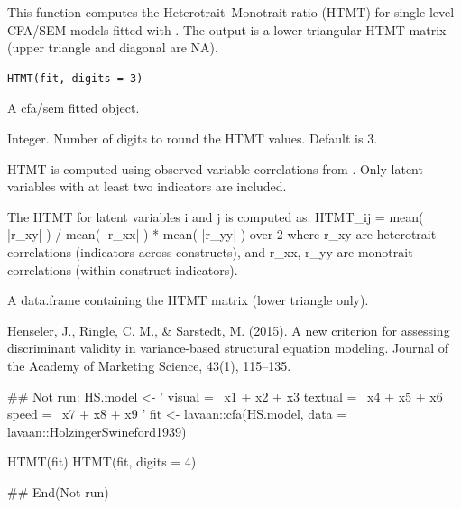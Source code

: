 \documentclass[a4paper]{book}
\begin{document}
%
\begin{Description}
This function computes the Heterotrait–Monotrait ratio (HTMT)
for single-level CFA/SEM models fitted with .
The output is a lower-triangular HTMT matrix (upper triangle and diagonal are NA).
\end{Description}
%
\begin{Usage}
\begin{verbatim}
HTMT(fit, digits = 3)
\end{verbatim}
\end{Usage}
%
\begin{Arguments}
\begin{ldescription}
\item[\code{fit}] A  cfa/sem fitted object.

\item[\code{digits}] Integer. Number of digits to round the HTMT values. Default is 3.
\end{ldescription}
\end{Arguments}
%
\begin{Details}
HTMT is computed using observed-variable correlations from
.
Only latent variables with at least two indicators are included.

The HTMT for latent variables i and j is computed as:
HTMT\_ij = mean( |r\_xy| ) /  mean( |r\_xx| ) * mean( |r\_yy| )  over 2
where r\_xy are heterotrait correlations (indicators across constructs),
and r\_xx, r\_yy are monotrait correlations (within-construct indicators).
\end{Details}
%
\begin{Value}
A data.frame containing the HTMT matrix (lower triangle only).
\end{Value}
%
\begin{References}
Henseler, J., Ringle, C. M., \& Sarstedt, M. (2015).
A new criterion for assessing discriminant validity in variance-based
structural equation modeling. Journal of the Academy of Marketing Science,
43(1), 115–135.
\end{References}
%
\begin{Examples}
\begin{ExampleCode}
## Not run: 
HS.model <- '
  visual  =~ x1 + x2 + x3
  textual =~ x4 + x5 + x6
  speed   =~ x7 + x8 + x9
'
fit <- lavaan::cfa(HS.model, data = lavaan::HolzingerSwineford1939)

HTMT(fit)
HTMT(fit, digits = 4)

## End(Not run)
\end{ExampleCode}
\end{Examples}
\end{document}
